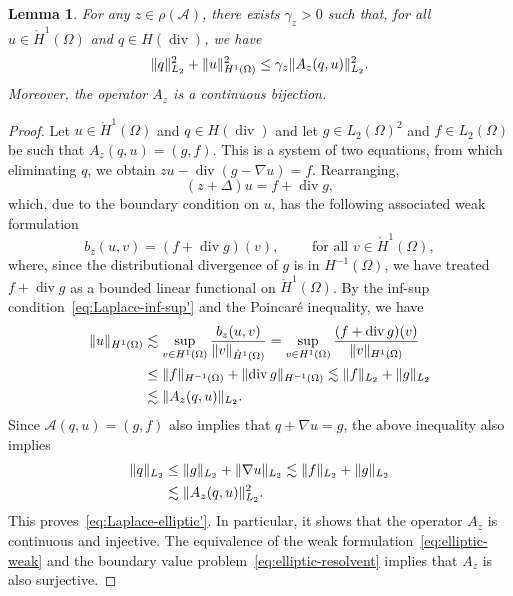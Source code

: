 \documentclass[12pt, oneside, reqno]{amsart}
\newtheorem{lemma}[theorem]{Lemma}
\theoremstyle{remark}
\newcommand{\tForAll}{\text{ for all }}
\DeclareMathOperator{\diver}{div}
\DeclarePairedDelimiter{\norm}{\lVert}{\rVert}
\newcommand{\Ac}{\mathcal{A}}
\newcommand{\Af}{{A}}
\newcommand{\om}{\Omega}
\newcommand{\Ho}{\mathring{H}}
\begin{document}
\begin{lemma}
  \label{lem:Laplace-elliptic'}
  For any \(z \in \rho(\Ac)\), there exists \(\gamma_z > 0\) such that, for all
  \(u \in \mathring{H}^1(\Omega)\) and \(q \in H(\diver)\), we have
  \begin{equation}
    \label{eq:Laplace-elliptic'}
    \norm{q}_{L_2%
    }^2 +
    \norm{u}_{H^1(\Omega)
    }^2 
    \leq \gamma_z \norm{\Af_z (q, u)}_{L_2}^2.
  \end{equation}
  Moreover, the operator \(\Af_z\) is a continuous bijection.
\end{lemma}
\begin{proof}
  Let \(u \in \mathring{H}^1(\Omega)\) and \(q \in H(\diver)\) and let
  \(g \in L_2(\Omega)^2\) and \(f \in L_2(\Omega)\) be such that
  \(\Af_z (q, u) = (g, f)\). This is a  system of two equations, from which 
  eliminating $q$, we obtain 
  $
    z u - \diver(g - \nabla u) = f.
  $
  Rearranging,
  \[
    (z + \Delta) u  = f + \diver g,
  \]
  which, due to the boundary condition on $u$, has the following
  associated weak formulation
  \[
    b_z(u,v) = (f + \diver g)(v), \qquad \tForAll v \in \mathring{H}^1(\Omega),
  \]
  where, since the distributional divergence of $g$ is in $H^{-1}(\om)$, we have treated $f + \diver g$ as a bounded linear functional on $\Ho^1(\om)$.
  By the inf-sup condition~\eqref{eq:Laplace-inf-sup'} and
  the Poincaré inequality, we have
  \begin{align*}
    \norm{ u}_{H^1(\om)}
     & \lesssim \sup_{v \in H^1(\Omega)}
     \frac{b_z(u, v)}{\norm{v}_{\mathring{H}^1(\Omega)}} 
       = \sup_{v \in H^1(\Omega)}
       \frac{(f + \diver g)(v)}{\| v \|_{H^1(\Omega)}}
    \\
     & \leq \norm{f}_{H^{-1}(\Omega)} + \norm{\diver g}_{H^{-1}(\Omega)}
       \lesssim \norm{f}_{L_2}+ \norm{g}_{L_2}
    \\
     & \lesssim \norm{\Af_z (q, u)}_{L_2}. %
  \end{align*}
  Since $\Ac(q, u) = (g, f)$ also  implies that $q + \nabla u = g$, the above inequality also implies
  \begin{align*}
    \norm{q}_{L_2}
&       \leq \norm{g}_{L_2} + \norm{\nabla u}_{L_2}
      \lesssim \norm{f}_{L_2}+ \norm{g}_{L_2}
    \\
    & 
      \lesssim \norm{\Af_z (q, u)}_{L_2}^2. %
  \end{align*}
  This proves~\eqref{eq:Laplace-elliptic'}.  In particular, it shows
  that the operator \(\Af_z\) is continuous and injective.  The
  equivalence of the weak formulation~\eqref{eq:elliptic-weak} and the
  boundary value problem~\eqref{eq:elliptic-resolvent} implies that
  \(\Af_z\) is also surjective.
\end{proof}
\end{document}
